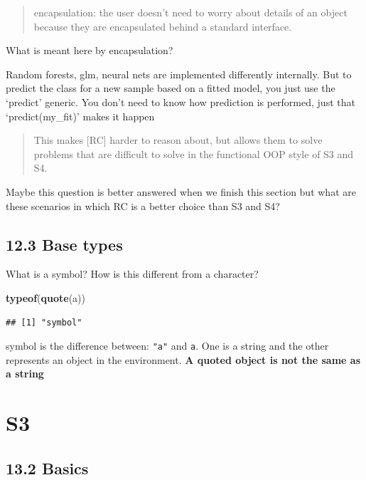 \documentclass[]{book}
\newenvironment{Shaded}{\begin{snugshade}}{\end{snugshade}}
\newcommand{\KeywordTok}[1]{\textcolor[rgb]{0.13,0.29,0.53}{\textbf{#1}}}
\newcommand{\NormalTok}[1]{#1}
\begin{document}
\begin{quote}
encapsulation: the user doesn't need to worry about details of an object because they are encapsulated behind a standard interface.
\end{quote}

What is meant here by encapsulation?

Random forests, glm, neural nets are implemented differently internally. But to predict the class for a new sample based on a fitted model, you just use the `predict' generic. You don't need to know how prediction is performed, just that `predict(my\_fit)' makes it happen

\begin{quote}
This makes {[}RC{]} harder to reason about, but allows them to solve problems that are difficult to solve in the functional OOP style of S3 and S4.
\end{quote}

Maybe this question is better answered when we finish this section but what are these scenarios in which RC is a better choice than S3 and S4?

\hypertarget{base-types-1}{%
\section*{12.3 Base types}\label{base-types-1}}

What is a symbol? How is this different from a character?

\begin{Shaded}
\begin{Highlighting}[]
\KeywordTok{typeof}\NormalTok{(}\KeywordTok{quote}\NormalTok{(a))}
\end{Highlighting}
\end{Shaded}

\begin{verbatim}
## [1] "symbol"
\end{verbatim}

symbol is the difference between: \texttt{"a"} and \texttt{a}. One is a string and the other represents an object in the environment. \textbf{A quoted object is not the same as a string}

\hypertarget{s3}{%
\chapter{S3}\label{s3}}

\hypertarget{basics}{%
\section*{13.2 Basics}\label{basics}}
\end{document}
